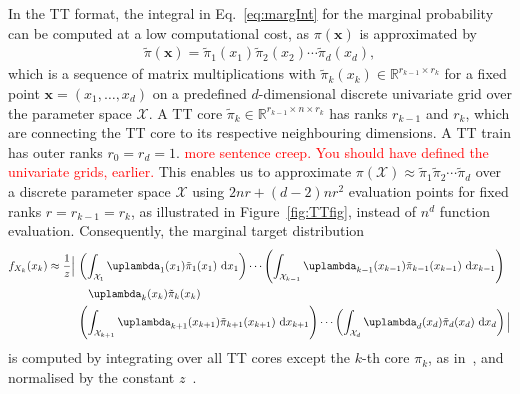 In the TT format, the integral in Eq.~\ref{eq:margInt} for the marginal probability can be computed at a low computational cost, as $\pi(\bm{x})$ is approximated by
\begin{align*}
	\tilde{\pi}(\bm{x}) = 	\tilde{\pi}_1(x_1)  \tilde{\pi}_2(x_2)  \cdots \tilde{\pi}_d(x_d),
\end{align*}
which is a sequence of matrix multiplications with $\tilde{\pi}_k(x_k) \in \mathbb{R}^{r_{k-1} \times r_k}$ for a fixed point $\bm{x} = (x_1, \dots, x_d)$ on a predefined $d$-dimensional discrete univariate grid over the parameter space $\mathcal{X}$. 
A TT core  $\tilde{\pi}_k \in \mathbb{R}^{r_{k-1} \times n \times r_k}$ has ranks $ r_{k-1}$ and $r_k$, which are connecting the TT core to its respective neighbouring dimensions.
A TT train has outer ranks $r_0 = r_d = 1$.  \textcolor{red}{more sentence creep. You should have defined the univariate grids, earlier.}
This enables us to approximate $\pi(\mathcal{X})\approx \tilde{\pi}_1  \tilde{\pi}_2  \cdots \tilde{\pi}_d$ over a discrete parameter space $\mathcal{X}$ using $2nr + (d-2)nr^2$ evaluation points for fixed ranks $r =r_{k-1} = r_k $, as illustrated in Figure~\ref{fig:TTfig}, instead of $n^d$ function evaluation.
Consequently, the marginal target distribution
\begin{align}
	\begin{split}
		f_{X_k}(x_k) \approx \frac{1}{z} \Big|\, 
		&\left( \int_{\mathcal{X}_1} \uplambda_1(x_1) \tilde{\pi}_1(x_1) \, \diff x_1 \right) \cdots 
		\left( \int_{\mathcal{X}_{k-1}} \uplambda_{k-1}(x_{k-1}) \tilde{\pi}_{k-1}(x_{k-1}) \, \diff x_{k-1} \right) \\
		&\quad \uplambda_k(x_k) \tilde{\pi}_k(x_k) \\
		& \left( \int_{\mathcal{X}_{k+1}} \uplambda_{k+1}(x_{k+1}) \tilde{\pi}_{k+1}(x_{k+1}) \,\diff x_{k+1} \right) \cdots 
		\left( \int_{\mathcal{X}_{d}} \uplambda_d(x_d) \tilde{\pi}_d(x_d) \, \diff x_d \right)
		\Big| 
	\end{split}
\end{align}
is computed by integrating over all TT cores except the $k$-th core $\pi_k$, as in~\cite{dolgov2020approximation}, and normalised by the constant $z$~\cite{cui2022deep}.

